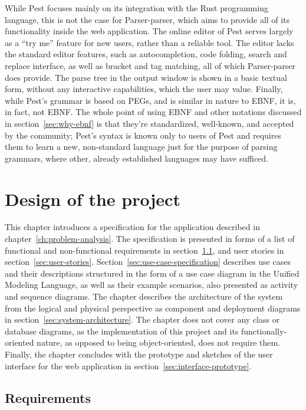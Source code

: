 \documentclass[english,engineering]{wizthesis}
\newcommand{\thisproject}{Parser-parser}
\begin{document}
While Pest focuses mainly on its integration with the Rust programming language,
this is not the case for \thisproject{}, which aims to provide all of its
functionality inside the web application. The online editor of Pest serves
largely as a ``try me'' feature for new users, rather than a reliable tool. The
editor lacks the standard editor features, such as autocompletion, code folding,
search and replace interface, as well as bracket and tag matching, all of which
\thisproject{} does provide. The parse tree in the output window is shown in a
basic textual form, without any interactive capabilities, which the user may
value. Finally, while Pest's grammar is based on PEGs, and is similar in nature
to EBNF, it is, in fact, not EBNF. The whole point of using EBNF and other
notations discussed in section~\ref{sec:why-ebnf} is that they're standardized,
well-known, and accepted by the community; Pest's syntax is known only to users
of Pest and requires them to learn a new, non-standard language just for the
purpose of parsing grammars, where other, already established languages may have
sufficed.

\chapter{Design of the project} \label{ch:design-of-the-project}

This chapter introduces a specification for the application described in
chapter~\ref{ch:problem-analysis}. The specification is presented in forms of a
list of functional and non-functional requirements in
section~\ref{sec:requirements}, and user stories in
section~\ref{sec:user-stories}. Section~\ref{sec:use-case-specification}
describes use cases and their descriptions structured in the form of a use case
diagram in the Unified Modeling Language, as well as their example scenarios,
also presented as activity and sequence diagrams. The chapter describes the
architecture of the system from the logical and physical perspective as
component and deployment diagrams in section~\ref{sec:system-architecture}. The
chapter does not cover any class or database diagrams, as the implementation of
this project and its functionally-oriented nature, as opposed to being
object-oriented, does not require them. Finally, the chapter concludes with the
prototype and sketches of the user interface for the web application in
section~\ref{sec:interface-prototype}.

\section{Requirements} \label{sec:requirements}
\end{document}
